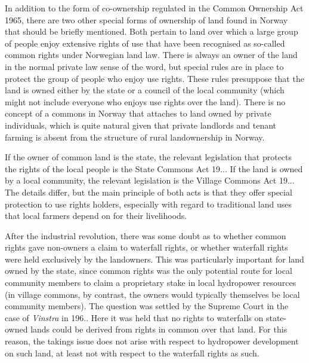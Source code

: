In addition to the form of co-ownership regulated in the Common Ownership Act 1965, there are two other special forms of ownership of land found in Norway that should be briefly mentioned. Both pertain to land over which a large group of people enjoy extensive rights of use that have been recognised as so-called common rights under Norwegian land law. There is always an owner of the land in the normal private law sense of the word, but special rules are in place to protect the group of people who enjoy use rights. These rules presuppose that the land is owned either by the state or a council of the local community (which might not include everyone who enjoys use rights over the land). There is no concept of a commons in Norway that attaches to land owned by private individuals, which is quite natural given that private landlords and tenant farming is  absent from the structure of rural landownership in Norway.

If the owner of common land is the state, the relevant legislation that protects the rights of the local people is the State Commons Act 19... If the land is owned by a local community, the relevant legislation is the Village Commons Act 19... The details differ, but the main principle of both acts is that they offer special protection to use rights holders, especially with regard to traditional land uses that local farmers depend on for their livelihoods.

After the industrial revolution, there was some doubt as to whether common rights gave non-owners a claim to waterfall rights, or whether waterfall rights were held exclusively by the landowners. This was particularly important for land owned by the state, since common rights was the only potential route for local community members to claim a proprietary stake in local hydropower resources (in village commons, by contrast, the owners would typically themselves be local community members). The question was settled by the Supreme Court in the case of {\it Vinstra} in 196.. Here it was held that no rights to waterfalls on state-owned lands could be derived from rights in common over that land. For this reason, the takings issue does not arise with respect to hydropower development on such land, at least not with respect to the waterfall rights as such. 

